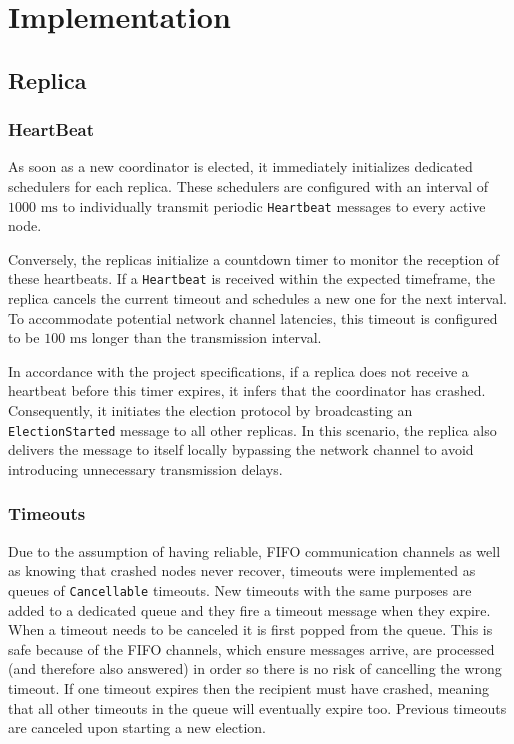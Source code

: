 \section{Implementation}
\subsection{Replica}
\subsubsection{HeartBeat}
As soon as a new coordinator is elected, it immediately initializes dedicated schedulers for each replica. These schedulers are configured with an interval of $1000\text{ ms}$ to individually transmit periodic \texttt{Heartbeat} messages to every active node. 

Conversely, the replicas initialize a countdown timer to monitor the reception of these heartbeats. If a \texttt{Heartbeat} is received within the expected timeframe, the replica cancels the current timeout and schedules a new one for the next interval. To accommodate potential network channel latencies, this timeout is configured to be $100\text{ ms}$ longer than the transmission interval.

In accordance with the project specifications, if a replica does not receive a heartbeat before this timer expires, it infers that the coordinator has crashed. Consequently, it initiates the election protocol by broadcasting an \texttt{ElectionStarted} message to all other replicas. In this scenario, the replica also delivers the message to itself locally bypassing the network channel to avoid introducing unnecessary transmission delays.

\subsubsection{Timeouts}
Due to the assumption of having reliable, FIFO communication channels as well as knowing that crashed nodes never recover, timeouts
were implemented as queues of \texttt{Cancellable} timeouts. New timeouts with the same purposes are added to a dedicated queue and they fire a timeout message when they
expire. When a timeout needs to be canceled it is first popped from the queue. This is safe because of the FIFO channels, which ensure
messages arrive, are processed (and therefore also answered) in order so there is no risk of cancelling the wrong timeout. If one timeout
expires then the recipient must have crashed, meaning that all other timeouts in the queue will eventually expire too. Previous timeouts are
canceled upon starting a new election.

